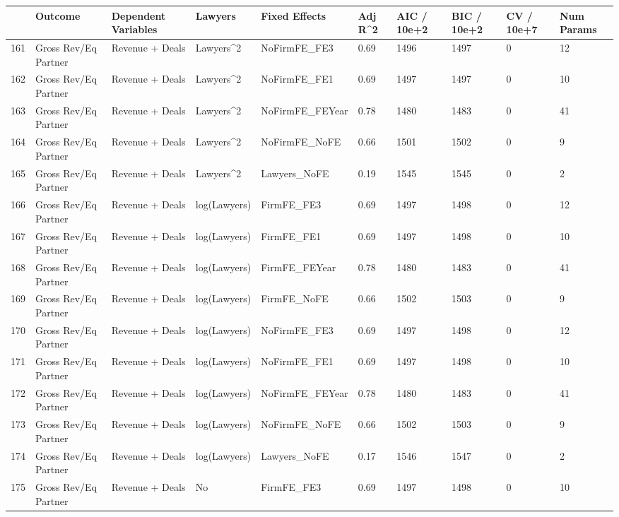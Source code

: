 \documentclass{article}
\begin{document}
\begin{table}[H]
\centering
\begin{tabular}{rlllllllll}
  \hline
 & Outcome & Dependent Variables & Lawyers & Fixed Effects & Adj R^2 & AIC / 10e+2 & BIC / 10e+2 & CV / 10e+7 & Num Params \\ 
  \hline
161 & Gross Rev/Eq Partner & Revenue + Deals & Lawyers^2 & NoFirmFE\_FE3 & 0.69 & 1496 & 1497 & 0 & 12 \\ 
  162 & Gross Rev/Eq Partner & Revenue + Deals & Lawyers^2 & NoFirmFE\_FE1 & 0.69 & 1497 & 1497 & 0 & 10 \\ 
  163 & Gross Rev/Eq Partner & Revenue + Deals & Lawyers^2 & NoFirmFE\_FEYear & 0.78 & 1480 & 1483 & 0 & 41 \\ 
  164 & Gross Rev/Eq Partner & Revenue + Deals & Lawyers^2 & NoFirmFE\_NoFE & 0.66 & 1501 & 1502 & 0 & 9 \\ 
  165 & Gross Rev/Eq Partner & Revenue + Deals & Lawyers^2 & Lawyers\_NoFE & 0.19 & 1545 & 1545 & 0 & 2 \\ 
  166 & Gross Rev/Eq Partner & Revenue + Deals & log(Lawyers) & FirmFE\_FE3 & 0.69 & 1497 & 1498 & 0 & 12 \\ 
  167 & Gross Rev/Eq Partner & Revenue + Deals & log(Lawyers) & FirmFE\_FE1 & 0.69 & 1497 & 1498 & 0 & 10 \\ 
  168 & Gross Rev/Eq Partner & Revenue + Deals & log(Lawyers) & FirmFE\_FEYear & 0.78 & 1480 & 1483 & 0 & 41 \\ 
  169 & Gross Rev/Eq Partner & Revenue + Deals & log(Lawyers) & FirmFE\_NoFE & 0.66 & 1502 & 1503 & 0 & 9 \\ 
  170 & Gross Rev/Eq Partner & Revenue + Deals & log(Lawyers) & NoFirmFE\_FE3 & 0.69 & 1497 & 1498 & 0 & 12 \\ 
  171 & Gross Rev/Eq Partner & Revenue + Deals & log(Lawyers) & NoFirmFE\_FE1 & 0.69 & 1497 & 1498 & 0 & 10 \\ 
  172 & Gross Rev/Eq Partner & Revenue + Deals & log(Lawyers) & NoFirmFE\_FEYear & 0.78 & 1480 & 1483 & 0 & 41 \\ 
  173 & Gross Rev/Eq Partner & Revenue + Deals & log(Lawyers) & NoFirmFE\_NoFE & 0.66 & 1502 & 1503 & 0 & 9 \\ 
  174 & Gross Rev/Eq Partner & Revenue + Deals & log(Lawyers) & Lawyers\_NoFE & 0.17 & 1546 & 1547 & 0 & 2 \\ 
  175 & Gross Rev/Eq Partner & Revenue + Deals & No & FirmFE\_FE3 & 0.69 & 1497 & 1498 & 0 & 10 \\ 

\end{tabular}
\end{table}
\end{document}
